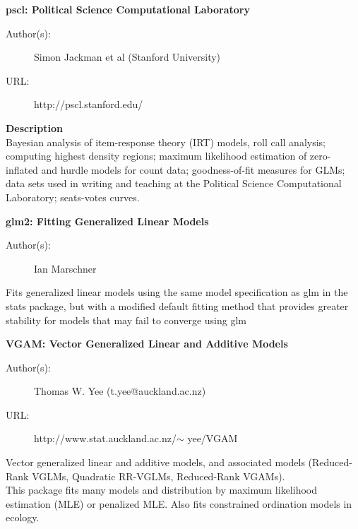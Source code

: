 \documentclass[MASTER.tex]{subfiles}
\begin{document}
\begin{frame}
	\textbf{pscl: Political Science Computational Laboratory} %

\begin{description}
	\item[Author(s):] Simon Jackman et al (Stanford University)
	\item[URL:] http://pscl.stanford.edu/
\end{description}\bigskip

\textbf{Description}\\
Bayesian analysis of item-response theory (IRT) models, roll call analysis; computing highest density regions; maximum likelihood estimation of zero-inflated and hurdle models for count data; goodness-of-fit measures for GLMs; data sets used in writing and teaching at the Political Science Computational Laboratory; seats-votes curves.
\end{frame}

\begin{frame}
	\textbf{glm2: Fitting Generalized Linear Models}
\begin{description}
	\item[Author(s):] Ian Marschner 

\end{description}
Fits generalized linear models using the same model specification as glm in the stats package, but with a modified default fitting method that provides greater stability for models that may fail to converge using glm
\end{frame}


\begin{frame}
	\textbf{VGAM: Vector Generalized Linear and Additive Models}
\begin{description}
\item[Author(s):] Thomas W. Yee (t.yee@auckland.ac.nz)
\item[URL:] http://www.stat.auckland.ac.nz/$\sim$ yee/VGAM
\end{description}\bigskip
Vector generalized linear and additive models, and associated models (Reduced-Rank VGLMs, Quadratic RR-VGLMs, Reduced-Rank VGAMs). \\ \bigskip This package fits many models and distribution by maximum likelihood estimation (MLE) or penalized MLE. Also fits constrained ordination models in ecology.
\end{frame}
\end{document}
